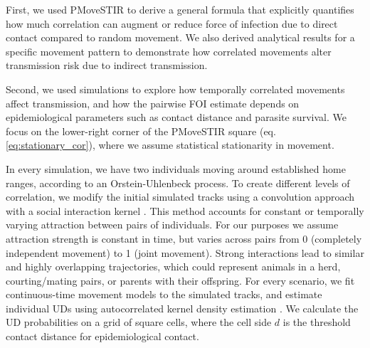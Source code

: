 \documentclass[letterpaper]{article}
\begin{document}
First, we used PMoveSTIR to derive a general formula that explicitly quantifies how much correlation can augment or reduce force of infection due to direct contact compared to random movement. We also derived analytical results for a specific movement pattern to demonstrate how correlated movements alter transmission risk due to indirect transmission.

Second, we used simulations to explore how temporally correlated movements affect  transmission, and how the pairwise FOI estimate depends on epidemiological parameters such as contact distance and parasite survival. We focus on the lower-right corner of the PMoveSTIR square (eq. \ref{eq:stationary_cor}), where we assume statistical stationarity in movement. 

In every simulation, we have two individuals moving around established home ranges, according to an Orstein-Uhlenbeck process. To create different levels of correlation, we modify the initial simulated tracks using a convolution approach with a social interaction kernel \citep{Scharf2018}. This method accounts for constant or temporally varying attraction between pairs of individuals. For our purposes we assume attraction strength is constant in time, but varies across pairs from 0 (completely independent movement) to 1 (joint movement). Strong interactions lead to similar and highly overlapping trajectories, which could represent animals in a herd, courting/mating pairs, or parents with their offspring.
For every scenario, we fit continuous-time movement models to the simulated tracks, and estimate individual UDs using autocorrelated kernel density estimation \citep{Calabrese2016}. We calculate the UD probabilities on a grid of square cells, where the cell side $d$ is the threshold contact distance for epidemiological contact. 
\end{document}
